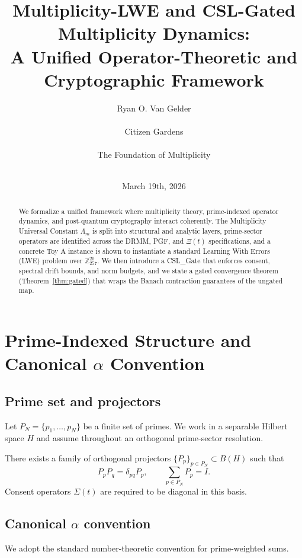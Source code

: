 \documentclass[11pt]{article}
\title{Multiplicity-LWE and CSL-Gated Multiplicity Dynamics:\\
A Unified Operator-Theoretic and Cryptographic Framework}
\author{Ryan O. Van Gelder \\ \\ Citizen Gardens \\ \\ The Foundation of Multiplicity \\ \\}
\date{March 19th, 2026}
\begin{document}
\maketitle

\begin{abstract}
We formalize a unified framework where multiplicity theory, prime-indexed operator
dynamics, and post-quantum cryptography interact coherently. The Multiplicity
Universal Constant $\Lambda_m$ is split into structural and analytic layers,
prime-sector operators are identified across the DRMM, PGF, and $\Xi(t)$
specifications, and a concrete Toy A instance is shown to instantiate a
standard Learning With Errors (LWE) problem over $\mathbb{Z}_{257}^{20}$.
We then introduce a CSL\_Gate that enforces consent, spectral drift bounds,
and norm budgets, and we state a gated convergence theorem (Theorem~\ref{thm:gated})
that wraps the Banach contraction guarantees of the ungated map.
\end{abstract}

\newpage
\tableofcontents
\newpage
\section{Prime-Indexed Structure and Canonical $\alpha$ Convention}

\subsection{Prime set and projectors}

Let $P_N = \{p_1, \dots, p_N\}$ be a finite set of primes. We work in a separable
Hilbert space $H$ and assume throughout an orthogonal prime-sector resolution.

\begin{assumption}\label{ass:orthogonal-resolution}
There exists a family of orthogonal projectors $\{P_p\}_{p \in P_N} \subset B(H)$
such that
\[
P_p P_q = \delta_{pq} P_p,\qquad \sum_{p \in P_N} P_p = I.
\]
Consent operators $\Sigma(t)$ are required to be diagonal in this basis.
\end{assumption}

\subsection{Canonical $\alpha$ convention}

We adopt the standard number-theoretic convention for prime-weighted sums.
\end{document}
